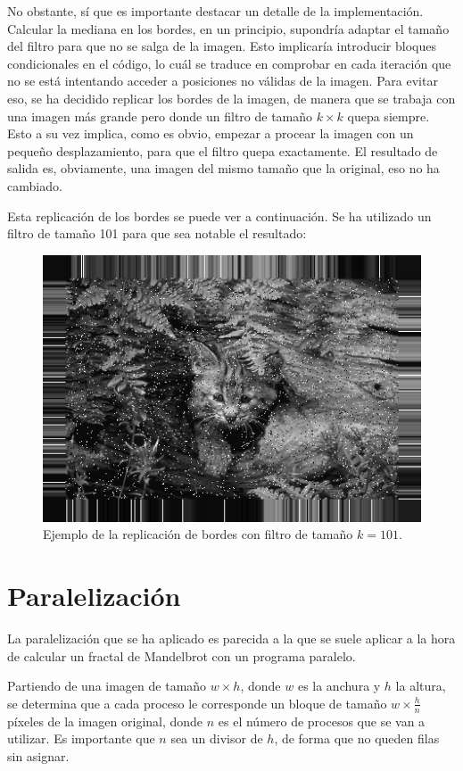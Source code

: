 \documentclass[11pt,a4paper]{article}
\begin{document}
No obstante, sí que es importante destacar un detalle de la implementación. Calcular la mediana
en los bordes, en un principio, supondría adaptar el tamaño del filtro para que no se salga de
la imagen. Esto implicaría introducir bloques condicionales en el código, lo cuál
se traduce en comprobar en cada iteración que no se está intentando acceder a posiciones no
válidas de la imagen. Para evitar eso, se ha decidido replicar los bordes de la imagen, de manera
que se trabaja con una imagen más grande pero donde un filtro de tamaño $k \times k$ quepa
siempre. Esto a su vez implica, como es obvio, empezar a procear la imagen con un pequeño
desplazamiento, para que el filtro quepa exactamente. El resultado de salida es, obviamente,
una imagen del mismo tamaño que la original, eso no ha cambiado.

Esta replicación de los bordes se puede ver a continuación. Se ha utilizado un filtro
de tamaño 101 para que sea notable el resultado:

\begin{figure}[H]
  \centering
  \includegraphics[scale=0.6]{img/borders-cat}
  \caption{Ejemplo de la replicación de bordes con filtro de tamaño $k = 101$.}
  \label{fig:borders-cat}
\end{figure}

\section{Paralelización}

La paralelización que se ha aplicado es parecida a la que se suele aplicar a la hora de
calcular un fractal de Mandelbrot con un programa paralelo.

Partiendo de una imagen de tamaño $w \times h$, donde $w$ es la anchura y $h$ la altura,
se determina que a cada proceso le corresponde un bloque de tamaño $w \times \frac{h}{n}$ píxeles
de la imagen original, donde $n$ es el número de procesos que se van a utilizar. Es importante
que $n$ sea un divisor de $h$, de forma que no queden filas sin asignar.
\end{document}
